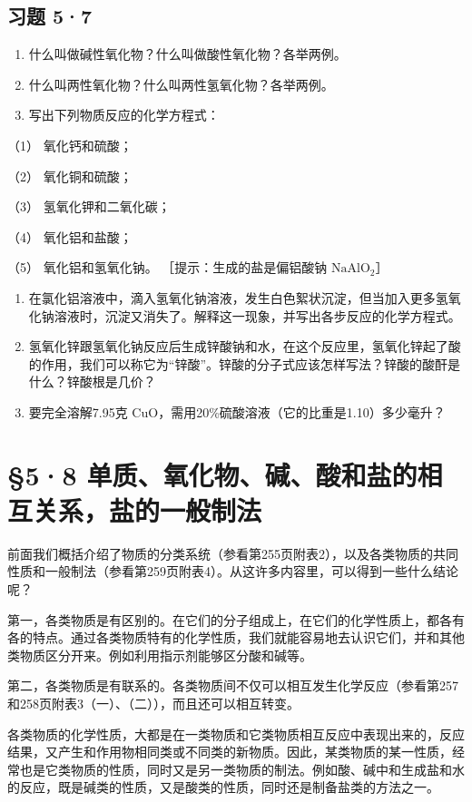\subsection{习题 5·7}

\begin{enumerate}
\item
  什么叫做碱性氧化物？什么叫做酸性氧化物？各举两例。
\item
  什么叫两性氧化物？什么叫两性氢氧化物？各举两例。
\item
  写出下列物质反应的化学方程式：
\end{enumerate}

（1） 氧化钙和硫酸；

（2） 氧化铜和硫酸；

（3） 氢氧化钾和二氧化碳；

（4） 氧化铝和盐酸；

（5） 氧化铝和氢氧化钠。 ［提示：生成的盐是偏铝酸钠
\(\mathrm{NaAlO}_{2}\)］

\begin{enumerate}[start=4]
\item
  在氯化铝溶液中，滴入氢氧化钠溶液，发生白色絮状沉淀，但当加入更多氢氧化钠溶液时，沉淀又消失了。解释这一现象，并写出各步反应的化学方程式。
\item
  氢氧化锌跟氢氧化钠反应后生成锌酸钠和水，在这个反应里，氢氧化锌起了酸的作用，我们可以称它为``锌酸''。锌酸的分子式应该怎样写法？锌酸的酸酐是什么？锌酸根是几价？
\item
  要完全溶解7.95克 CuO，需用20\%硫酸溶液（它的比重是1.10）多少毫升？
\end{enumerate}

\section{§5·8 单质、氧化物、碱、酸和盐的相互关系，盐的一般制法}

前面我们概括介绍了物质的分类系统（参看第255页附表2），以及各类物质的共同性质和一般制法（参看第259页附表4）。从这许多内容里，可以得到一些什么结论呢？

第一，各类物质是有区别的。在它们的分子组成上，在它们的化学性质上，都各有各的特点。通过各类物质特有的化学性质，我们就能容易地去认识它们，并和其他类物质区分开来。例如利用指示剂能够区分酸和碱等。

第二，各类物质是有联系的。各类物质间不仅可以相互发生化学反应（参看第257和258页附表3（一）、（二）），而且还可以相互转变。

各类物质的化学性质，大都是在一类物质和它类物质相互反应中表现出来的，反应结果，又产生和作用物相同类或不同类的新物质。因此，某类物质的某一性质，经常也是它类物质的性质，同时又是另一类物质的制法。例如酸、碱中和生成盐和水的反应，既是碱类的性质，又是酸类的性质，同时还是制备盐类的方法之一。

